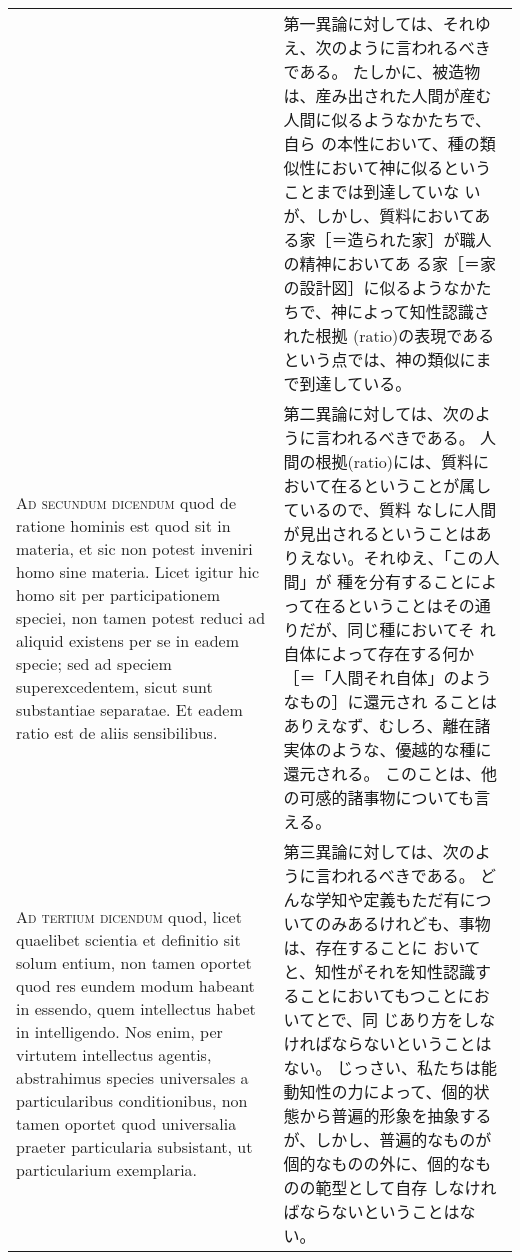 \documentclass[10pt]{jsarticle} %
\begin{document}
\begin{longtable}{p{21em}p{21em}}
&

第一異論に対しては、それゆえ、次のように言われるべきである。
たしかに、被造物は、産み出された人間が産む人間に似るようなかたちで、自ら
 の本性において、種の類似性において神に似るということまでは到達していな
 いが、しかし、質料においてある家［＝造られた家］が職人の精神においてあ
 る家［＝家の設計図］に似るようなかたちで、神によって知性認識された根拠
 (ratio)の表現であるという点では、神の類似にまで到達している。

\\

{\scshape Ad secundum dicendum} quod de ratione hominis
est quod sit in materia, et sic non potest inveniri homo sine
materia. Licet igitur hic homo sit per participationem speciei, non
tamen potest reduci ad aliquid existens per se in eadem specie; sed ad
speciem superexcedentem, sicut sunt substantiae separatae. Et eadem
ratio est de aliis sensibilibus.


&

第二異論に対しては、次のように言われるべきである。
人間の根拠(ratio)には、質料において在るということが属しているので、質料
 なしに人間が見出されるということはありえない。それゆえ、「この人間」が
 種を分有することによって在るということはその通りだが、同じ種においてそ
 れ自体によって存在する何か［＝「人間それ自体」のようなもの］に還元され
 ることはありえなず、むしろ、離在諸実体のような、優越的な種に還元される。
 このことは、他の可感的諸事物についても言える。


\\


{\scshape Ad tertium dicendum} quod, licet quaelibet
scientia et definitio sit solum entium, non tamen oportet quod res
eundem modum habeant in essendo, quem intellectus habet in
intelligendo. Nos enim, per virtutem intellectus agentis, abstrahimus
species universales a particularibus conditionibus, non tamen oportet
quod universalia praeter particularia subsistant, ut particularium
exemplaria.

&
第三異論に対しては、次のように言われるべきである。
どんな学知や定義もただ有についてのみあるけれども、事物は、存在することに
 おいてと、知性がそれを知性認識することにおいてもつことにおいてとで、同
 じあり方をしなければならないということはない。
じっさい、私たちは能動知性の力によって、個的状態から普遍的形象を抽象する
 が、しかし、普遍的なものが個的なものの外に、個的なものの範型として自存
 しなければならないということはない。


\\



\end{longtable}
\end{document}
